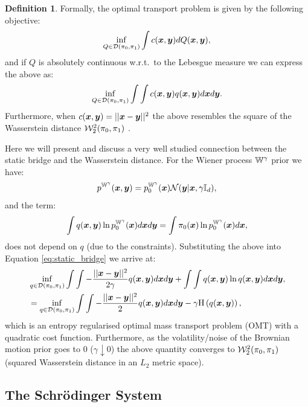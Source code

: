 \documentclass[a4paper,12pt,twoside,openright]{report}
\theoremstyle{definition}
\newtheorem{definition}{Definition}[section]
\begin{document}
\begin{definition}
Formally, the optimal transport problem is given by the following objective:
\begin{align*}
\inf_{Q \in {\mathcal{D}}(\pi_0, \pi_1)}\int  c({\bm{x}}, {\bm{y}}) dQ({\bm{x}}, {\bm{y}}),
\end{align*}
and if $Q$ is absolutely continuous w.r.t.\ to the Lebesgue measure we can express the above as:
\begin{align*}
\inf_{Q \in {\mathcal{D}}(\pi_0, \pi_1)}\int \int c({\bm{x}}, {\bm{y}}) q({\bm{x}}, {\bm{y}}) d{\bm{x}} d{\bm{y}}.
\end{align*}
Furthermore, when $ c({\bm{x}}, {\bm{y}}) = || {\bm{x}} - {\bm{y}}||^2$  the above resembles the square of the Wasserstein distance ${\mathcal{W}}^2_{2}(\pi_0, \pi_1)$ .
\end{definition}

Here we will present and discuss a very well studied \citep{mikami2008optimal,leonard2012schrodinger,leonard2013survey,carlier2017convergence} connection between the static bridge and the Wasserstein distance.  For the Wiener process $\mathbb{W}^\gamma$ prior we have:
\begin{align}
    p^{\mathbb{W}^{\gamma}}({\bm{x}},{\bm{y}}) = p^{\mathbb{W}^{\gamma}}_0({\bm{x}}){\mathcal{N}}({\bm{y}} | {\bm{x}}, \gamma{\mathbb{I}_d}),
\end{align}
and the term:
\begin{align*}
    \int q({\bm{x}}, {\bm{y}})\ln  p^{\mathbb{W}^{\gamma}}_0({\bm{x}}) d{\bm{x}} d{\bm{y}} =  \int \pi_0({\bm{x}}) \ln  p^{\mathbb{W}^{\gamma}}_0({\bm{x}}) d{\bm{x}}  ,
\end{align*}
does not depend on $q$ (due to the constraints). Substituting the above into Equation \ref{eq:static_bridge} we arrive at:
\begin{align}
    &\inf _{q \in {\mathcal{D}}(\pi_0, \pi_1)}\int \int -\frac{||{\bm{x}} - {\bm{y}} ||^2}{2\gamma} q({\bm{x}}, {\bm{y}}) d{\bm{x}} d{\bm{y}}  + \int \int q({\bm{x}}, {\bm{y}}) \ln q({\bm{x}}, {\bm{y}}) d{\bm{x}} d{\bm{y}}, \nonumber \\
    &=\inf _{q \in {\mathcal{D}}(\pi_0, \pi_1)}\int \int -\frac{||{\bm{x}} - {\bm{y}} ||^2}{2} q({\bm{x}}, {\bm{y}}) d{\bm{x}} d{\bm{y}}  - \gamma \text{H} \left(q({\bm{x}}, {\bm{y}})\right),
\end{align}
which is an entropy regularised optimal mass transport problem (OMT) \citep{villani2003topics} with a quadratic cost function. Furthermore, as the volatility/noise of the Brownian motion prior goes to 0 ($\gamma \downarrow 0$) the above quantity converges to ${\mathcal{W}}^2_{2}(\pi_0, \pi_1)$ (squared Wasserstein distance in an $L_2$ metric space).
\subsection{The Schrödinger System}
\end{document}
